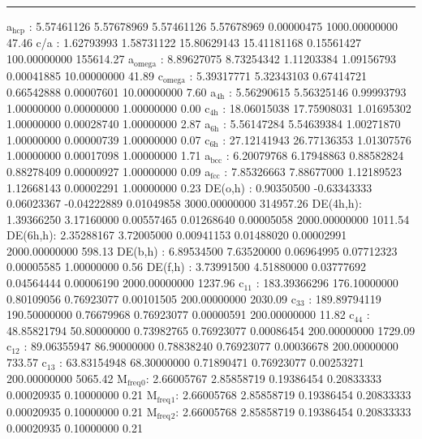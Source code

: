 \documentclass[11pt]{article}
\begin{document}
\noindent\rule{\textwidth}{0.5pt}
a\(_{\text{hcp}}\)   :   5.57461126   5.57678969   5.57461126   5.57678969   0.00000475 1000.00000000        47.46
c/a     :   1.62793993   1.58731122  15.80629143  15.41181168   0.15561427 100.00000000    155614.27
a\(_{\text{omega}}\) :   8.89627075   8.73254342   1.11203384   1.09156793   0.00041885  10.00000000        41.89
c\(_{\text{omega}}\) :   5.39317771   5.32343103   0.67414721   0.66542888   0.00007601  10.00000000         7.60
a\(_{\text{4h}}\)    :   5.56290615   5.56325146   0.99993793   1.00000000   0.00000000   1.00000000         0.00
c\(_{\text{4h}}\)    :  18.06015038  17.75908031   1.01695302   1.00000000   0.00028740   1.00000000         2.87
a\(_{\text{6h}}\)    :   5.56147284   5.54639384   1.00271870   1.00000000   0.00000739   1.00000000         0.07
c\(_{\text{6h}}\)    :  27.12141943  26.77136353   1.01307576   1.00000000   0.00017098   1.00000000         1.71
a\(_{\text{bcc}}\)   :   6.20079768   6.17948863   0.88582824   0.88278409   0.00000927   1.00000000         0.09
a\(_{\text{fcc}}\)   :   7.85326663   7.88677000   1.12189523   1.12668143   0.00002291   1.00000000         0.23
DE(o,h) :   0.90350500  -0.63343333   0.06023367  -0.04222889   0.01049858 3000.00000000    314957.26
DE(4h,h):   1.39366250   3.17160000   0.00557465   0.01268640   0.00005058 2000.00000000      1011.54
DE(6h,h):   2.35288167   3.72005000   0.00941153   0.01488020   0.00002991 2000.00000000       598.13
DE(b,h) :   6.89534500   7.63520000   0.06964995   0.07712323   0.00005585   1.00000000         0.56
DE(f,h) :   3.73991500   4.51880000   0.03777692   0.04564444   0.00006190 2000.00000000      1237.96
c\(_{\text{11}}\)    : 183.39366296 176.10000000   0.80109056   0.76923077   0.00101505 200.00000000      2030.09
c\(_{\text{33}}\)    : 189.89794119 190.50000000   0.76679968   0.76923077   0.00000591 200.00000000        11.82
c\(_{\text{44}}\)    :  48.85821794  50.80000000   0.73982765   0.76923077   0.00086454 200.00000000      1729.09
c\(_{\text{12}}\)    :  89.06355947  86.90000000   0.78838240   0.76923077   0.00036678 200.00000000       733.57
c\(_{\text{13}}\)    :  63.83154948  68.30000000   0.71890471   0.76923077   0.00253271 200.00000000      5065.42
M\(_{\text{freq}}\)\(_{\text{0}}\):   2.66005767   2.85858719   0.19386454   0.20833333   0.00020935   0.10000000         0.21
M\(_{\text{freq}}\)\(_{\text{1}}\):   2.66005768   2.85858719   0.19386454   0.20833333   0.00020935   0.10000000         0.21
M\(_{\text{freq}}\)\(_{\text{2}}\):   2.66005768   2.85858719   0.19386454   0.20833333   0.00020935   0.10000000         0.21
\end{document}
